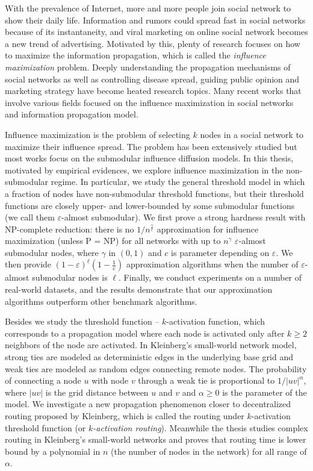 \begin{englishabstract}

With the prevalence of Internet, more and more people join social network to show their daily life.
Information and rumors could spread fast in social networks because of its instantaneity, and viral marketing on online social network becomes a new trend of advertising. 
Motivated by this, plenty of research focuses on how to maximize the information propagation, which is called the {\it influence maximization} problem.
Deeply understanding the propagation mechanisms of social networks as well as controlling disease spread,
guiding public opinion and marketing strategy have become heated research topics.
Many recent works that involve various fields focused on the influence maximization in social networks and information propagation model.

Influence maximization is the problem of selecting $k$ nodes in a social network to maximize their influence spread.
The problem has been extensively studied but most works focus on the submodular influence diffusion models.
In this thesis, motivated by empirical evidences, we explore influence maximization in the non-submodular regime.
In particular, we study the general threshold model in which a fraction of nodes have non-submodular threshold
	functions, but their threshold functions are closely upper- and lower-bounded by some submodular
	functions (we call them $\varepsilon$-almost submodular).
We first prove a strong hardness result with NP-complete reduction: there is no $1/n^{\frac{\gamma}{c}}$ approximation for influence maximization (unless P = NP)
	for all networks with up to $n^{\gamma}$ $\varepsilon$-almost submodular nodes, where $\gamma$ in $(0,1)$ 
	and $c$ is parameter depending on $\varepsilon$.
We then provide $(1-\varepsilon)^{\ell}(1-\frac{1}{e})$ approximation algorithms when the number of $\varepsilon$-almost submodular nodes is $\ell$.
Finally, we conduct experiments on a number of real-world datasets, and the results demonstrate that our approximation algorithms
	outperform other benchmark algorithms.

Besides we study the threshold function -- $k$-activation function, 
which corresponds to a propagation model where each node is activated only
after $k \ge 2$ neighbors of the node are activated.
In Kleinberg's small-world network model, strong ties are modeled as deterministic edges in the
underlying base grid and weak ties are modeled as random edges connecting remote nodes.
The probability of connecting a node $u$ with node $v$ through a weak tie is proportional to
$1/|uv|^\alpha$, where $|uv|$ is the grid distance between $u$ and $v$ and $\alpha\ge 0$ is the
parameter of the model.
We investigate a new propagation phenomenon closer to decentralized routing proposed by Kleinberg,
which is called the routing under $k$-activation threshold function (or {\it $k$-activation routing}).
Meanwhile the thesis studies complex routing in Kleinberg's small-world networks and proves that
routing time is lower bound by a polynomial in $n$ (the number of nodes in the network) for all range of $\alpha$.


\end{englishabstract}
